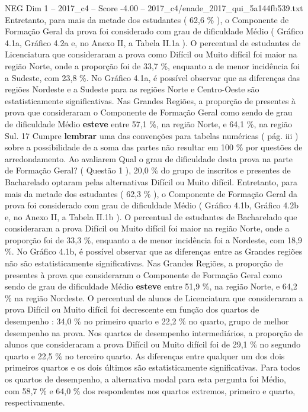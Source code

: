 \begin{textsample}{NEG Dim 1 – 2017\_c4 – Score -4.00 – 2017\_c4/enade\_2017\_qui\_5a144fb539.txt}
Entretanto, para mais da metade dos estudantes ( 62,6 \% ), o Componente de Formação Geral da prova foi considerado com grau de dificuldade Médio ( Gráfico 4.1a, Gráfico 4.2a e, no Anexo II, a Tabela II.1a ).
O percentual de estudantes de Licenciatura que consideraram a prova como Difícil ou Muito difícil foi maior na região Norte, onde a proporção foi de 33,7 \%, enquanto a de menor incidência foi a Sudeste, com 23,8 \%.
No Gráfico 4.1a, é possível observar que as diferenças das regiões Nordeste e a Sudeste para as regiões Norte e Centro-Oeste são estatisticamente significativas.
Nas Grandes Regiões, a proporção de presentes à prova que consideraram o Componente de Formação Geral como sendo de grau de dificuldade Médio \textbf{esteve} entre 57,1 \%, na região Norte, e 64,1 \%, na região Sul. 17 Cumpre \textbf{lembrar} uma das convenções para tabelas numéricas ( pág. iii ) sobre a possibilidade de a soma das partes não resultar em 100 \% por questões de arredondamento.
Ao avaliarem Qual o grau de dificuldade desta prova na parte de Formação Geral? ( Questão 1 ), 20,0 \% do grupo de inscritos e presentes de Bacharelado optaram pelas alternativas Difícil ou Muito difícil.
Entretanto, para mais da metade dos estudantes ( 62,3 \% ), o Componente de Formação Geral da prova foi considerado com grau de dificuldade Médio ( Gráfico 4.1b, Gráfico 4.2b e, no Anexo II, a Tabela II.1b ).
O percentual de estudantes de Bacharelado que consideraram a prova Difícil ou Muito difícil foi maior na região Norte, onde a proporção foi de 33,3 \%, enquanto a de menor incidência foi a Nordeste, com 18,9 \%.
No Gráfico 4.1b, é possível observar que as diferenças entre as Grandes regiões não são estatisticamente significativas.
Nas Grandes Regiões, a proporção de presentes à prova que consideraram o Componente de Formação Geral como sendo de grau de dificuldade Médio \textbf{esteve} entre 51,9 \%, na região Norte, e 64,2 \% na região Nordeste.
O percentual de alunos de Licenciatura que consideraram a prova Difícil ou Muito difícil foi decrescente em função dos quartos de desempenho : 34,0 \% no primeiro quarto e 22,2 \% no quarto, grupo de melhor desempenho na prova.
Nos quartos de desempenho intermediários, a proporção de alunos que consideraram a prova Difícil ou Muito difícil foi de 29,1 \% no segundo quarto e 22,5 \% no terceiro quarto.
As diferenças entre qualquer um dos dois primeiros quartos e os dois últimos são estatisticamente significativas.
Para todos os quartos de desempenho, a alternativa modal para esta pergunta foi Médio, com 58,7 \% e 64,0 \% dos respondentes nos quartos extremos, primeiro e quarto, respectivamente.

\end{textsample}

